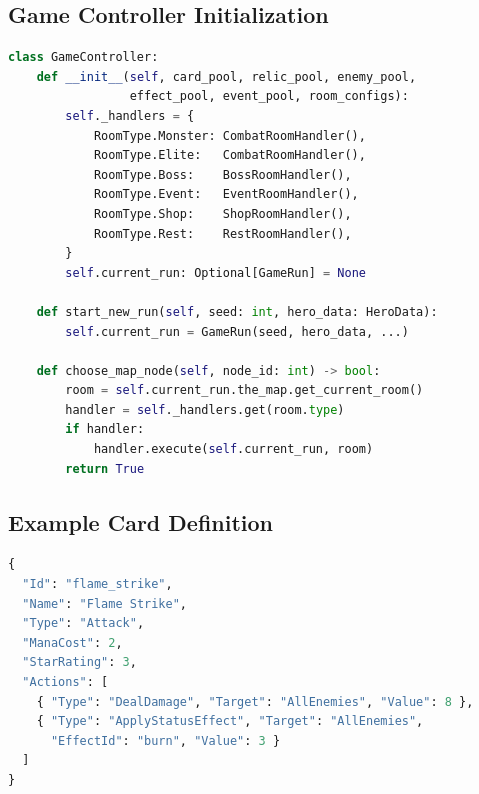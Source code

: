 \subsection*{Game Controller Initialization}
\begin{lstlisting}[language=Python, caption={GameController initialization (simplified)}, label=lst:game_controller]
class GameController:
    def __init__(self, card_pool, relic_pool, enemy_pool,
                 effect_pool, event_pool, room_configs):
        self._handlers = {
            RoomType.Monster: CombatRoomHandler(),
            RoomType.Elite:   CombatRoomHandler(),
            RoomType.Boss:    BossRoomHandler(),
            RoomType.Event:   EventRoomHandler(),
            RoomType.Shop:    ShopRoomHandler(),
            RoomType.Rest:    RestRoomHandler(),
        }
        self.current_run: Optional[GameRun] = None

    def start_new_run(self, seed: int, hero_data: HeroData):
        self.current_run = GameRun(seed, hero_data, ...)

    def choose_map_node(self, node_id: int) -> bool:
        room = self.current_run.the_map.get_current_room()
        handler = self._handlers.get(room.type)
        if handler:
            handler.execute(self.current_run, room)
        return True
\end{lstlisting}

\subsection*{Example Card Definition}
\begin{lstlisting}[language=Python, caption={Example card definition in GameData.json}, label=lst:card_json]
{
  "Id": "flame_strike",
  "Name": "Flame Strike",
  "Type": "Attack",
  "ManaCost": 2,
  "StarRating": 3,
  "Actions": [
    { "Type": "DealDamage", "Target": "AllEnemies", "Value": 8 },
    { "Type": "ApplyStatusEffect", "Target": "AllEnemies",
      "EffectId": "burn", "Value": 3 }
  ]
}
\end{lstlisting}


